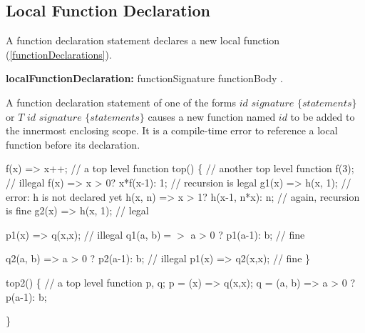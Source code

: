 \documentclass{article}
\begin{document}
\subsection{Local Function Declaration}

\LMHash{}
A function declaration statement declares a new local function (\ref{functionDeclarations}).

 \begin{grammar}
{\bf localFunctionDeclaration:}
    functionSignature functionBody
  .
 \end{grammar}

\LMHash{}
A function declaration statement of one of the forms $id$ $signature$ $\{ statements \}$ or $T$ $id$ $signature$ $\{ statements \}$ causes a new function named $id$ to be added to the innermost enclosing scope. It is a compile-time error to reference a local function before its declaration.



\begin{dartCode}
f(x) => x++;  // a top level function
top() \{ // another top level function
  f(3); // illegal
  f(x) => x > 0? x*f(x-1): 1;  // recursion is legal
  g1(x) => h(x, 1); // error: h is not declared yet
  h(x, n) => x > 1? h(x-1, n*x): n; // again, recursion is fine
  g2(x) => h(x, 1); // legal

  p1(x) => q(x,x); // illegal
  q1(a, b)$ =>$ a > 0 ? p1(a-1): b; // fine

  q2(a, b) => a > 0 ? p2(a-1): b; // illegal
  p1(x) => q2(x,x); // fine
\}
\end{dartCode}


\begin{dartCode}
top2() \{ // a top level function
 \VAR{} p, q;
  p = (x) => q(x,x);
  q = (a, b) => a > 0 ? p(a-1): b;

\}
\end{dartCode}

\end{document}
